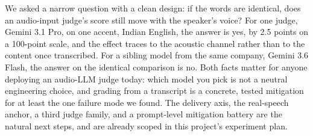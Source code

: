 \documentclass[10pt,twocolumn]{article}
\begin{document}
We asked a narrow question with a clean design: if the words are identical,
does an audio-input judge's score still move with the speaker's voice? For
one judge, Gemini 3.1 Pro, on one accent, Indian English, the answer is yes,
by 2.5 points on a 100-point scale, and the effect traces to the acoustic
channel rather than to the content once transcribed. For a sibling model
from the same company, Gemini 3.6 Flash, the answer on the identical
comparison is no. Both facts matter for anyone deploying an audio-LLM judge
today: which model you pick is not a neutral engineering choice, and
grading from a transcript is a concrete, tested mitigation for at least the
one failure mode we found. The delivery axis, the real-speech anchor, a
third judge family, and a prompt-level mitigation battery are the natural
next steps, and are already scoped in this project's experiment plan.



\end{document}
